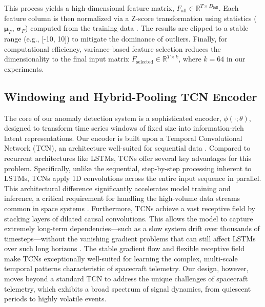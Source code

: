 \documentclass[journal]{IEEEtran}
\begin{document}
This process yields a high-dimensional feature matrix, $F_{\text{all}} \in \mathbb{R}^{T \times D_{\text{full}}}$. Each feature column is then normalized via a Z-score transformation using statistics ($\bm{\mu}_{F}$, $\bm{\sigma}_{F}$) computed from the training data \cite{patro2015normalization}. The results are clipped to a stable range (e.g., [-10, 10]) to mitigate the dominance of outliers. Finally, for computational efficiency, variance-based feature selection reduces the dimensionality to the final input matrix $F_{\text{selected}} \in \mathbb{R}^{T \times k}$, where $k=64$ in our experiments.

\subsection{Windowing and Hybrid-Pooling TCN Encoder}
\label{subsec:enhanced_tcn_encoder}

The core of our anomaly detection system is a sophisticated encoder, $\phi(\cdot; \theta)$, designed to transform time series windows of fixed size into information-rich latent representations. Our encoder is built upon a Temporal Convolutional Network (TCN), an architecture well-suited for sequential data \cite{bai2018empirical}. Compared to recurrent architectures like LSTMs, TCNs offer several key advantages for this problem. Specifically, unlike the sequential, step-by-step processing inherent to LSTMs, TCNs apply 1D convolutions across the entire input sequence in parallel. This architectural difference significantly accelerates model training and inference, a critical requirement for handling the high-volume data streams common in space systems \cite{gopali2021comparison}. Furthermore, TCNs achieve a vast receptive field by stacking layers of dilated causal convolutions. This allows the model to capture extremely long-term dependencies—such as a slow system drift over thousands of timesteps—without the vanishing gradient problems that can still affect LSTMs over such long horizons \cite{chen2022vanishing}. The stable gradient flow and flexible receptive field make TCNs exceptionally well-suited for learning the complex, multi-scale temporal patterns characteristic of spacecraft telemetry. Our design, however, moves beyond a standard TCN to address the unique challenges of spacecraft telemetry, which exhibits a broad spectrum of signal dynamics, from quiescent periods to highly volatile events.
\end{document}

